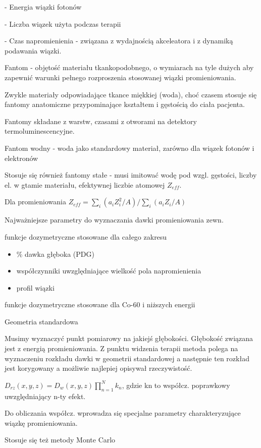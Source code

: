 \documentclass{article}
\begin{document}
- Energia wiązki fotonów

- Liczba wiązek użyta podczas terapii

- Czas napromienienia - związana z wydajnością akceleatora i z dynamiką podawania wiązki.

Fantom - objętość materiału tkankopodobnego, o wymiarach na tyle dużych aby zapewnić warunki pełnego rozproszenia stosowanej wiązki promieniowania.

Zwykle materiały odpowiadające tkance miękkiej (woda), choć czasem stosuje się fantomy anatomiczne przypominające kształtem i gęstością do ciała pacjenta.

Fantomy składane z warstw, czasami z otworami na detektory termoluminescencyjne.

Fantom wodny - woda jako standardowy materiał, zarówno dla wiązek fotonów i elektronów

Stosuje się również fantomy stałe - musi imitować wodę pod wzgl. gęstości, liczby el. w gtamie materiału, efektywnej liczbie atomowej $Z_{eff}$.

Dla promieniowania $Z_{eff} = \sum_{i}^{} (a_i Z_i^2 / A) / \sum_{i}^{} (a_i Z_i / A)$

Najważniejsze parametry do wyznaczania dawki promieniowania zewn.

funkcje dozymetryczne stosowane dla całego zakresu
\begin{itemize}
    \item \% dawka głęboka (PDG)
    \item współczynniki uwzględniające wielkość pola napromienienia
    \item profil wiązki
\end{itemize}

funkcje dozymetryczne stosowane dla Co-60 i niższych energii

Geometria standardowa

Musimy wyznaczyć punkt pomiarowy na jakiejś głębokości. Głębokość związana jest z energią promieniowania. Z punktu widzenia terapii metoda polega na wyznaczeniu rozkładu dawki w geometrii standardowej a następnie ten rozkład jest korygowany a możliwie najlepiej opisywał rzeczywistość.

$D_{rz}(x,y,z) = D_w(x,y,z)\prod_{n=1}^{N}k_n$, gdzie kn to współcz. poprawkowy uwzględniający n-ty efekt.

Do obliczania współcz. wprowadza się specjalne parametry charakteryzujące wiązkę promieniowania.

Stosuje się też metody Monte Carlo
\end{document}
